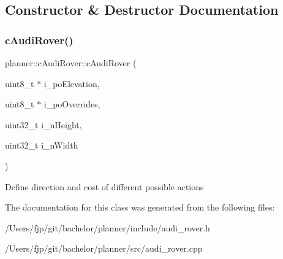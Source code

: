 \subsection{Constructor \& Destructor Documentation}
\mbox{\label{classplanner_1_1c_audi_rover_a433acb819672e065324dbbdb2a077ecb}} 
\subsubsection{\texorpdfstring{c\+Audi\+Rover()}{cAudiRover()}}
{\footnotesize\ttfamily planner\+::c\+Audi\+Rover\+::c\+Audi\+Rover (\begin{DoxyParamCaption}\item[{uint8\+\_\+t $\ast$}]{i\+\_\+po\+Elevation,  }\item[{uint8\+\_\+t $\ast$}]{i\+\_\+po\+Overrides,  }\item[{uint32\+\_\+t}]{i\+\_\+n\+Height,  }\item[{uint32\+\_\+t}]{i\+\_\+n\+Width }\end{DoxyParamCaption})}

Define direction and cost of different possible actions 

The documentation for this class was generated from the following files\+:\begin{DoxyCompactItemize}
\item 
/\+Users/fjp/git/bachelor/planner/include/audi\+\_\+rover.\+h\item 
/\+Users/fjp/git/bachelor/planner/src/audi\+\_\+rover.\+cpp\end{DoxyCompactItemize}
